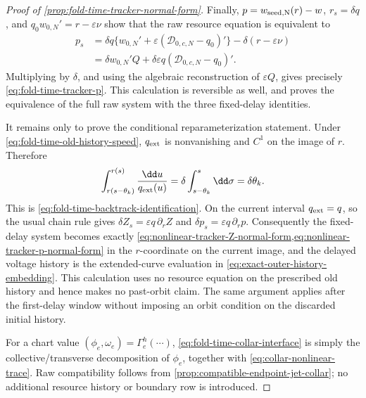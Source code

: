\begin{proof}[Proof of \cref{prop:fold-time-tracker-normal-form}]
Finally, \(p=w_{\rm seed,N}(r)-w\), \(r_s=\delta q\), and
\(q_0w_{0,N}'=r-\varepsilon\nu\) show that the raw resource equation is
equivalent to
\begin{align*}
 p_s
 &=\delta q\{w_{0,N}'
          +\varepsilon(\mathcal D_{0,c,N}-q_0)'\}
       -\delta(r-\varepsilon\nu)\\
 &=\delta w_{0,N}'Q
       +\delta\varepsilon q(\mathcal D_{0,c,N}-q_0)'.
\end{align*}
Multiplying by \(\delta\), and using the algebraic reconstruction of
\(\varepsilon Q\), gives precisely
\cref{eq:fold-time-tracker-p}.  This calculation is reversible as well,
and proves the equivalence of the full raw system with the three
fixed-delay identities.

It remains only to prove the conditional reparameterization statement.
Under \cref{eq:fold-time-old-history-speed}, \(q_{\rm ext}\) is
nonvanishing and \(C^1\) on the image of \(r\).  Therefore
\[
 \int_{r(s-\theta_k)}^{r(s)}
       \frac{\dd u}{q_{\rm ext}(u)}
 =\delta\int_{s-\theta_k}^{s}\dd\sigma
 =\delta\theta_k.
\]
This is \cref{eq:fold-time-backtrack-identification}.  On the current
interval \(q_{\rm ext}=q\), so the usual chain rule gives
\(\delta Z_s=\varepsilon q\,\partial_rZ\) and
\(\delta p_s=\varepsilon q\,\partial_rp\).  Consequently the fixed-delay
system becomes exactly
\cref{eq:nonlinear-tracker-Z-normal-form,eq:nonlinear-tracker-p-normal-form}
in the \(r\)-coordinate on the current image, and the delayed voltage
history is the extended-curve evaluation in
\cref{eq:exact-outer-history-embedding}.  This calculation uses no resource
equation on the prescribed old history and hence makes no past-orbit claim.
The same argument applies after the first-delay window without imposing an
orbit condition on the discarded initial history.

For a chart value \((\phi_e,\omega_e)=\Gamma_e^h(\cdots)\),
\cref{eq:fold-time-collar-interface} is simply the collective/transverse
decomposition of \(\phi_e\), together with
\cref{eq:collar-nonlinear-trace}.  Raw compatibility follows from
\cref{prop:compatible-endpoint-jet-collar}; no additional resource history
or boundary row is introduced.
\end{proof}

